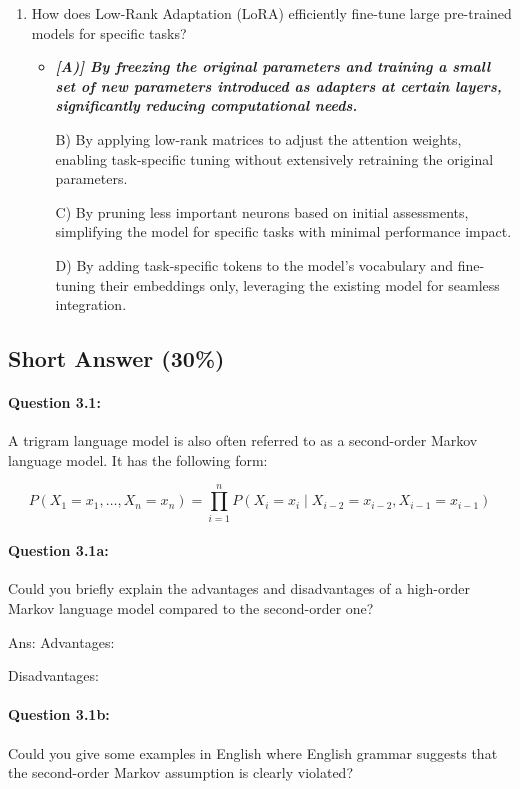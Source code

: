 \documentclass[10pt]{article}
\begin{document}
\begin{enumerate}
\item How does Low-Rank Adaptation (LoRA) efficiently fine-tune large pre-trained models for specific tasks?
    \begin{itemize}
        \item\textbf{\textit{[A)] By freezing the original parameters and training a small set of new parameters introduced as adapters at certain layers, significantly reducing computational needs.}}
        \item[B)] By applying low-rank matrices to adjust the attention weights, enabling task-specific tuning without extensively retraining the original parameters.
        \item[C)] By pruning less important neurons based on initial assessments, simplifying the model for specific tasks with minimal performance impact.
        \item[D)] By adding task-specific tokens to the model’s vocabulary and fine-tuning their embeddings only, leveraging the existing model for seamless integration.
    \end{itemize}



\end{enumerate}

\newpage
\subsection{Short Answer (30\%)}
\paragraph{Question 3.1:} A trigram language model is also often referred to as a second-order Markov language model. It has the following form:

$$
  P\left(X_{1}=x_{1}, \ldots, X_{n}=x_{n}\right)=\prod_{i=1}^{n} P\left(X_{i}=x_{i} \mid X_{i-2}=x_{i-2}, X_{i-1}=x_{i-1}\right)
$$

\paragraph{Question 3.1a:} Could you briefly explain the advantages and disadvantages of a high-order Markov language model compared to the second-order one?

Ans:
    Advantages:

    Disadvantages:

\paragraph{Question 3.1b:} Could you give some examples in English where English grammar suggests that the second-order Markov assumption is clearly violated?
\end{document}
